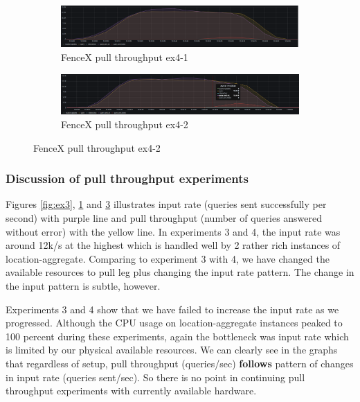 \documentclass[a4]{report}
\begin{document}
    \begin{figure}
        \centering
        \begin{subfigure}[b]{\textwidth}
            \centering
            \caption{FenceX pull throughput ex4-1}
            \label{fig:ex4-1}
            \includegraphics[width=\textwidth, height=0.35\textheight, scale=2]{images/evaluation/ex4-benchmarking(19,10).png}
        \end{subfigure}

        \begin{subfigure}[b]{\textwidth}
            \centering
            \caption{FenceX pull throughput ex4-2}
            \label{fig:ex4-2}
            \includegraphics[width=\textwidth, height=0.35\textheight, scale=2]{images/evaluation/ex4-benchmarking(22,10).png}
        \end{subfigure}
    \end{figure}

    \clearpage

    \subsubsection{Discussion of pull throughput experiments}
    Figures \ref{fig:ex3}, \ref{fig:ex4-1} and \ref{fig:ex4-2} illustrates input rate (queries sent successfully per
    second) with purple line and pull throughput (number of queries answered without error) with the yellow line.
    In experiments 3 and 4, the input rate was around 12k/s at the highest which is handled well by 2 rather rich
    instances of location-aggregate.
    Comparing to experiment 3 with 4, we have changed the available resources to pull leg plus changing the input
    rate pattern.
    The change in the input pattern is subtle, however.

    Experiments 3 and 4 show that we have failed to increase the input rate as we progressed.
    Although the CPU usage on location-aggregate instances peaked to 100 percent during these experiments,
    again the bottleneck was input rate which is limited by our physical available resources.
    We can clearly see in the graphs that regardless of setup, pull throughput (queries/sec) \textbf{follows} pattern
    of changes in input rate (queries sent/sec).
    So there is no point in continuing pull throughput experiments with currently available hardware.
\end{document}

